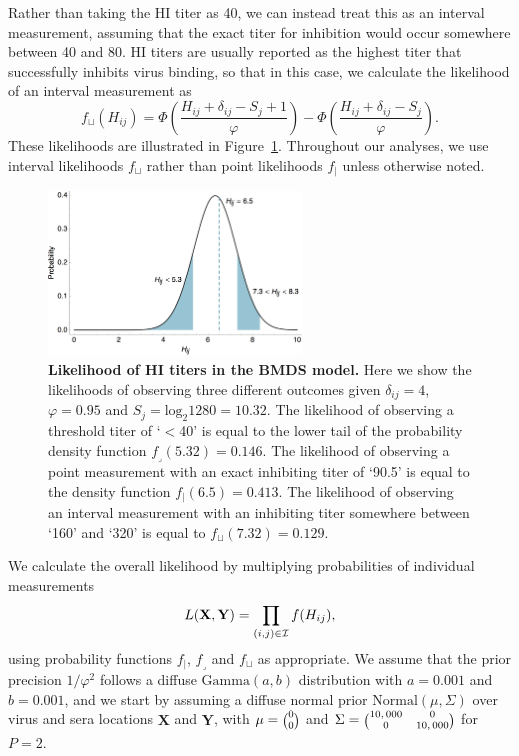 \documentclass[11pt,oneside,letterpaper]{article}
\newcommand{\point}{f_{\scriptscriptstyle \vert}}	%
\newcommand{\threshold}{f_{\textstyle \lrcorner}}	%
\newcommand{\interval}{f_{\sqcup}}					%
\newcommand{\mdssd}{\varphi}						%
\newcommand{\twomatrix}[2]{\scriptsize \Big( \begin{matrix} #1 \\ #2 \end{matrix} \Big)}				%
\newcommand{\fourmatrix}[4]{\scriptsize \Big( \begin{matrix} #1 & #2 \\ #3 & #4 \end{matrix} \Big)}		%
\begin{document}
Rather than taking the HI titer as 40, we can instead treat this as an interval measurement, assuming that the exact titer for inhibition would occur somewhere between 40 and 80.
HI titers are usually reported as the highest titer that successfully inhibits virus binding, so that in this case, we calculate the likelihood of an interval measurement as
\begin{equation} 
	\interval(H_{ij}) = \Phi \left( \frac{ H_{ij} + \delta_{ij} - S_j + 1 }{ \mdssd } \right) - \Phi \left( \frac{ H_{ij} + \delta_{ij} - S_j }{\mdssd} \right).
\end{equation}
These likelihoods are illustrated in Figure~\ref{hij_likelihood}.
Throughout our analyses, we use interval likelihoods $\interval$ rather than point likelihoods $\point$ unless otherwise noted.

\begin{figure}[tb]
	\centering		
	\includegraphics[width=0.6\textwidth]{figures/hij_likelihood}
	\caption{\textbf{Likelihood of HI titers in the BMDS model.} 
	Here we show the likelihoods of observing three different outcomes given $\delta_{ij} = 4$, $\mdssd = 0.95$ and $S_j = \mathrm{log}_2 1280 = 10.32$.  
	The likelihood of observing a threshold titer of `$<$40' is equal to the lower tail of the probability density function $\threshold(5.32) = 0.146$.
	The likelihood of observing a point measurement with an exact inhibiting titer of `90.5' is equal to the density function $\point(6.5) = 0.413$.
	The likelihood of observing an interval measurement with an inhibiting titer somewhere between `160' and `320' is equal to $\interval(7.32) = 0.129.$
	} 
	\label{hij_likelihood} 
\end{figure}

We calculate the overall likelihood by multiplying probabilities of individual measurements
\begin{equation} 
	L(\mathbf{X},\mathbf{Y}) = \prod_{(i,j) \in \cal I} f(H_{ij}),
\end{equation}
using probability functions $\point$, $\threshold$ and $\interval$ as appropriate.
We assume that the prior precision $1/\mdssd^2$ follows a diffuse $\mbox{Gamma}(a, b)$ distribution with $a=0.001$ and $b=0.001$, and we start by assuming a diffuse normal prior $\mathrm{Normal}(\mu,\Sigma)$ over virus and sera locations $\mathbf{X}$ and $\mathbf{Y}$, with $\mu = \twomatrix{0}{0}$ and $\Sigma = \fourmatrix{10,000}{0}{0}{10,000}$ for $P=2$.
\end{document}
